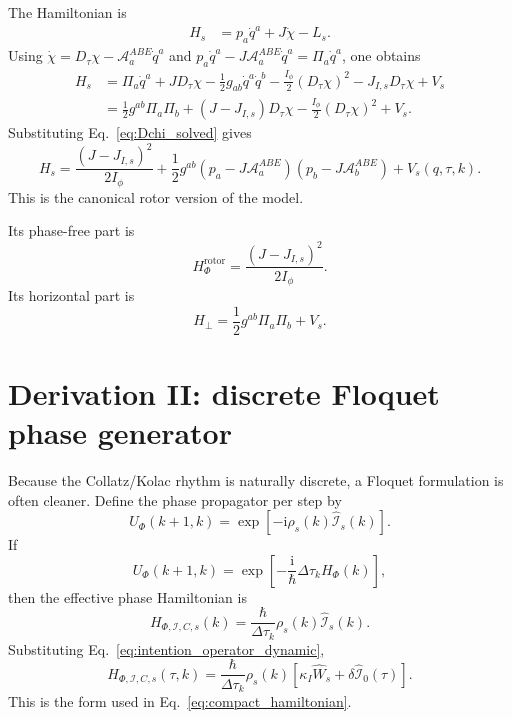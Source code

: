 \documentclass[11pt,a4paper]{article}
\newcommand{\ii}{\mathrm i}
\newcommand{\Abe}{\mathcal A^{ABE}}
\newcommand{\Iop}{\hat{\mathcal I}}
\newcommand{\Wop}{\hat W}
\newcommand{\kappaI}{\kappa_I}
\begin{document}
The Hamiltonian is
\begin{align}
  H_s
  &=p_a\dot q^a+J\dot\chi-L_s.
\end{align}
Using $\dot\chi=D_\tau\chi-\Abe_a\dot q^a$ and $p_a\dot q^a-J\Abe_a\dot q^a=\Pi_a\dot q^a$, one obtains
\begin{align}
  H_s
  &=\Pi_a\dot q^a+J D_\tau\chi
  -\frac12 g_{ab}\dot q^a\dot q^b
  -\frac{I_\phi}{2}(D_\tau\chi)^2
  -J_{I,s}D_\tau\chi+V_s\\
  &=\frac12 g^{ab}\Pi_a\Pi_b
  +\left(J-J_{I,s}\right)D_\tau\chi
  -\frac{I_\phi}{2}(D_\tau\chi)^2+V_s.
\end{align}
Substituting Eq.~\eqref{eq:Dchi_solved} gives
\begin{equation}
\boxed{
  H_s
  =\frac{(J-J_{I,s})^2}{2I_\phi}
  +\frac12 g^{ab}(p_a-J\Abe_a)(p_b-J\Abe_b)
  +V_s(q,\tau,k).}
  \label{eq:canonical_hamiltonian}
\end{equation}
This is the canonical rotor version of the model.

Its phase-free part is
\begin{equation}
  \boxed{H_{\Phi}^{\mathrm{rotor}}=\frac{(J-J_{I,s})^2}{2I_\phi}.}
\end{equation}
Its horizontal part is
\begin{equation}
  \boxed{H_\perp=\frac12g^{ab}\Pi_a\Pi_b+V_s.}
\end{equation}

\section{Derivation II: discrete Floquet phase generator}

Because the Collatz/Kolac rhythm is naturally discrete, a Floquet formulation is often cleaner. Define the phase propagator per step by
\begin{equation}
\boxed{
  U_\Phi(k+1,k)
  =\exp\left[-\ii\rho_s(k)\Iop_s(k)\right].}
  \label{eq:floquet_step}
\end{equation}
If
\begin{equation}
  U_\Phi(k+1,k)=\exp\left[-\frac{\ii}{\hbar}\Delta\tau_k H_\Phi(k)\right],
\end{equation}
then the effective phase Hamiltonian is
\begin{equation}
\boxed{
  H_{\Phi,\mathcal I,C,s}(k)
  =\frac{\hbar}{\Delta\tau_k}\rho_s(k)\Iop_s(k).}
  \label{eq:floquet_phase_hamiltonian}
\end{equation}
Substituting Eq.~\eqref{eq:intention_operator_dynamic},
\begin{equation}
\boxed{
  H_{\Phi,\mathcal I,C,s}(\tau,k)
  =\frac{\hbar}{\Delta\tau_k}\rho_s(k)
  \left[\kappaI\Wop_s+\delta\Iop_0(\tau)\right].}
  \label{eq:floquet_phase_hamiltonian_dynamic}
\end{equation}
This is the form used in Eq.~\eqref{eq:compact_hamiltonian}.
\end{document}
